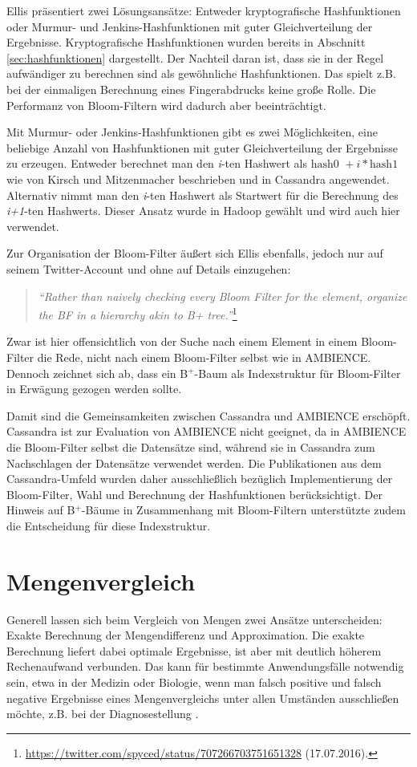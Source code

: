 Ellis präsentiert zwei Lösungsansätze: Entweder kryptografische Hashfunktionen oder Murmur- und Jenkins-Hashfunktionen mit guter Gleichverteilung der Ergebnisse. Kryptografische Hashfunktionen wurden bereits in Abschnitt \ref{sec:hashfunktionen} dargestellt. Der Nachteil daran ist, dass sie in der Regel aufwändiger zu berechnen sind als gewöhnliche Hashfunktionen. Das spielt z.B. bei der einmaligen Berechnung eines Fingerabdrucks keine große Rolle. Die Performanz von Bloom-Filtern wird dadurch aber beeinträchtigt. 

Mit Murmur- oder Jenkins-Hashfunktionen gibt es zwei Möglichkeiten, eine beliebige Anzahl von Hashfunktionen mit guter Gleichverteilung der Ergebnisse zu erzeugen. Entweder berechnet man den \textit{i}-ten Hashwert als $\text{hash0 }+ i\ast \text{hash1}$ wie von Kirsch und Mitzenmacher beschrieben und in Cassandra angewendet. Alternativ nimmt man den \textit{i}-ten Hashwert als Startwert für die Berechnung des \textit{i+1}-ten Hashwerts. Dieser Ansatz wurde in Hadoop gewählt und wird auch hier verwendet. 

Zur Organisation der Bloom-Filter äußert sich Ellis ebenfalls, jedoch nur auf seinem Twitter-Account und ohne auf Details einzugehen: 
\begin{quote}
\textit{"`Rather than naively checking every Bloom Filter for the element, organize the BF in a hierarchy akin to B+ tree."'}\footnote{\url{https://twitter.com/spyced/status/707266703751651328} (17.07.2016).}
\end{quote}
Zwar ist hier offensichtlich von der Suche nach einem Element in einem Bloom-Filter die Rede, nicht nach einem Bloom-Filter selbst wie in AMBIENCE. Dennoch zeichnet sich ab, dass ein B$^+$-Baum als Indexstruktur für Bloom-Filter in Erwägung gezogen werden sollte. 

Damit sind die Gemeinsamkeiten zwischen Cassandra und AMBIENCE erschöpft. Cassandra ist zur Evaluation von AMBIENCE nicht geeignet, da in AMBIENCE die Bloom-Filter selbst die Datensätze sind, während sie in Cassandra zum Nachschlagen der Datensätze verwendet werden. Die Publikationen aus dem Cassandra-Umfeld wurden daher ausschließlich bezüglich Implementierung der Bloom-Filter, Wahl und Berechnung der Hashfunktionen berücksichtigt. Der Hinweis auf B$^+$-Bäume in Zusammenhang mit Bloom-Filtern unterstützte zudem die Entscheidung für diese Indexstruktur. 
\section{Mengenvergleich}\label{sec:mengenvergleich}
Generell lassen sich beim Vergleich von Mengen zwei Ansätze unterscheiden: Exakte Berechnung der Mengendifferenz und Approximation. Die exakte Berechnung liefert dabei optimale Ergebnisse, ist aber mit deutlich höherem Rechenaufwand verbunden. Das kann für bestimmte Anwendungsfälle notwendig sein, etwa in der Medizin oder Biologie, wenn man falsch positive und falsch negative Ergebnisse eines Mengenvergleichs unter allen Umständen ausschließen möchte, z.B. bei der Diagnosestellung \cite{Schnell2013}. 

